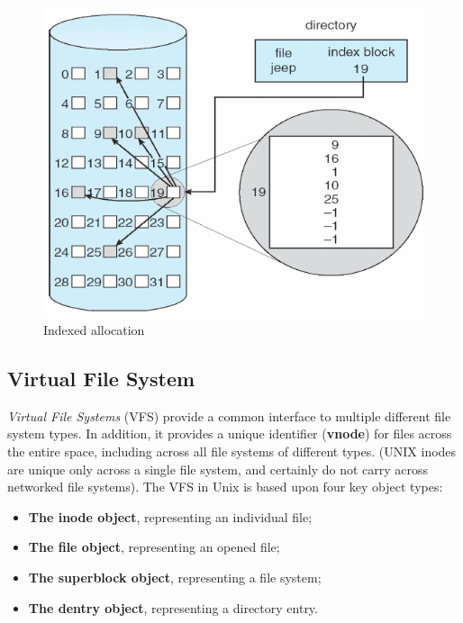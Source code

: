 \begin{figure}[hbtp]
\centering
\includegraphics[scale=0.35]{images/file_system/indexed_allocation.png}
\caption{Indexed allocation}
\end{figure}

\subsection{Virtual File System}
\emph{Virtual File Systems} (VFS) provide a common interface to multiple different file system types. In addition, it provides a unique identifier (\textbf{vnode}) for files across the entire space, including across all file systems of different types. (UNIX inodes are unique only across a single file system, and certainly do not carry across networked file systems). The VFS in Unix is based upon four key object types:
\begin{itemize}
\item \textbf{The inode object}, representing an individual file;
\item \textbf{The file object}, representing an opened file;
\item \textbf{The superblock object}, representing a file system;
\item \textbf{The dentry object}, representing a directory entry.
\end{itemize}

